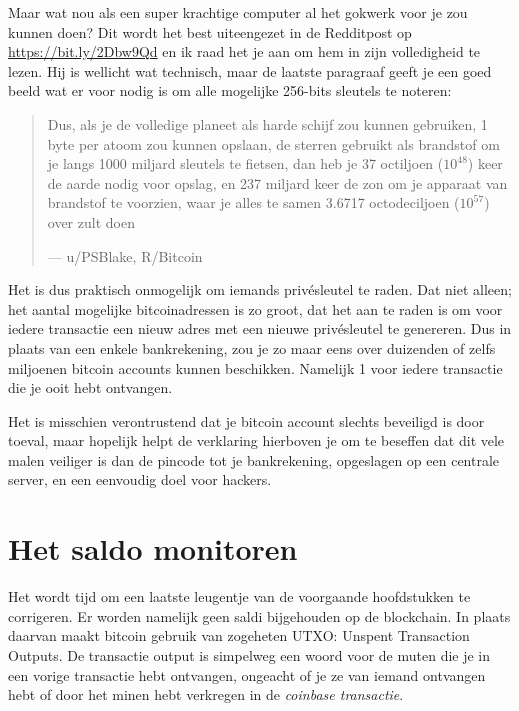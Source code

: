 \documentclass[
  letterpaper,
]{scrbook}
\begin{document}
Maar wat nou als een super krachtige computer al het gokwerk voor je zou
kunnen doen? Dit wordt het best uiteengezet in de Redditpost op
\url{https://bit.ly/2Dbw9Qd} en ik raad het je aan om hem in zijn
volledigheid te lezen. Hij is wellicht wat technisch, maar de laatste
paragraaf geeft je een goed beeld wat er voor nodig is om alle mogelijke
256-bits sleutels te noteren:

\begin{quote}
Dus, als je de volledige planeet als harde schijf zou kunnen gebruiken,
1 byte per atoom zou kunnen opslaan, de sterren gebruikt als brandstof
om je langs 1000 miljard sleutels te fietsen, dan heb je 37 octiljoen
(\(10^{48}\)) keer de aarde nodig voor opslag, en 237 miljard keer de
zon om je apparaat van brandstof te voorzien, waar je alles te samen
3.6717 octodeciljoen (\(10^{57}\)) over zult doen

--- {u/PSBlake, R/Bitcoin}
\end{quote}

Het is dus praktisch onmogelijk om iemands privésleutel te raden. Dat
niet alleen; het aantal mogelijke bitcoinadressen is zo groot, dat het
aan te raden is om voor iedere transactie een nieuw adres met een nieuwe
privésleutel te genereren. Dus in plaats van een enkele bankrekening,
zou je zo maar eens over duizenden of zelfs miljoenen bitcoin accounts
kunnen beschikken. Namelijk 1 voor iedere transactie die je ooit hebt
ontvangen.

Het is misschien verontrustend dat je bitcoin account slechts beveiligd
is door toeval, maar hopelijk helpt de verklaring hierboven je om te
beseffen dat dit vele malen veiliger is dan de pincode tot je
bankrekening, opgeslagen op een centrale server, en een eenvoudig doel
voor hackers.

\hypertarget{het-saldo-monitoren}{%
\section{Het saldo monitoren}\label{het-saldo-monitoren}}

Het wordt tijd om een laatste leugentje van de voorgaande hoofdstukken
te corrigeren. Er worden namelijk geen saldi bijgehouden op de
blockchain. In plaats daarvan maakt bitcoin gebruik van zogeheten UTXO:
Unspent Transaction Outputs. De transactie output is simpelweg een woord
voor de muten die je in een vorige transactie hebt ontvangen, ongeacht
of je ze van iemand ontvangen hebt of door het minen hebt verkregen in
de \emph{coinbase transactie}.
\end{document}
